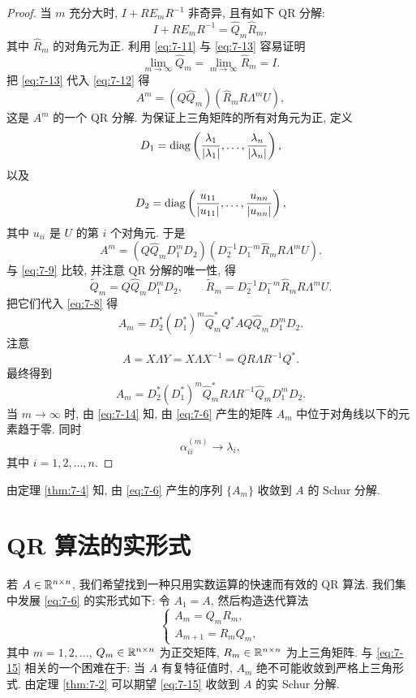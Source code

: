 \begin{proof}
当 $m$ 充分大时, $I+RE_mR^{-1}$ 非奇异, 且有如下 QR 分解:
\begin{equation}
  I+RE_mR^{-1}=\widehat{Q}_m\widehat{R}_m,
  \label{eq:7-13}
\end{equation}
其中 $\widehat{R}_m$ 的对角元为正. 利用 \eqref{eq:7-11} 与 \eqref{eq:7-13} 容易证明
\begin{equation}
  \lim_{m\rightarrow\infty}\widehat{Q}_m
  =\lim_{m\rightarrow\infty}\widehat{R}_m=I.
  \label{eq:7-14}
\end{equation}
把 \eqref{eq:7-13} 代入 \eqref{eq:7-12} 得
\[
  A^m=(Q\widehat{Q}_m)(\widehat{R}_mR\Lambda^mU),
\]
这是 $A^m$ 的一个 QR 分解. 为保证上三角矩阵的所有对角元为正, 定义
\[
  D_1=\operatorname{diag}\left(\frac{\lambda_1}{\left|\lambda_1\right|},\ldots,\frac{\lambda_n}{\left|\lambda_n\right|}\right),
\]
以及
\[
  D_2=\operatorname{diag}\left(\frac{u_{11}}{\left|u_{11}\right|},\ldots,\frac{u_{nn}}{\left|u_{nn}\right|}\right),
\]
其中 $u_{ii}$ 是 $U$ 的第 $i$ 个对角元. 于是
\[
  A^m=(Q\widehat{Q}_mD_1^mD_2)
  (D_2^{-1}D_1^{-m}\widehat{R}_mR\Lambda^mU).
\]
与 \eqref{eq:7-9} 比较, 并注意 QR 分解的唯一性, 得
\[
  \widetilde{Q}_m=Q\widehat{Q}_mD_1^mD_2,
  \qquad
  \widetilde{R}_m=D_2^{-1}D_1^{-m}\widehat{R}_mR\Lambda^mU.
\]
把它们代入 \eqref{eq:7-8} 得
\[
  A_m=D_2^*(D_1^*)^m\widehat{Q}_m^*Q^*AQ\widehat{Q}_mD_1^mD_2.
\]
注意
\[
  A=X\Lambda Y=X\Lambda X^{-1}=QR\Lambda R^{-1}Q^*.
\]
最终得到
\[
  A_m=D_2^*(D_1^*)^m\widehat{Q}_m^*R\Lambda R^{-1}\widehat{Q}_mD_1^mD_2.
\]
当 $m\rightarrow\infty$ 时, 由 \eqref{eq:7-14} 知, 由 \eqref{eq:7-6} 产生的矩阵 $A_m$ 中位于对角线以下的元素趋于零. 同时
\[
  \alpha_{ii}^{(m)}\rightarrow\lambda_i,
\]
其中 $i=1,2,\ldots,n$.
\end{proof}

由定理 \ref{thm:7-4} 知, 由 \eqref{eq:7-6} 产生的序列 $\{A_m\}$ 收敛到 $A$ 的 Schur 分解.

\section{QR 算法的实形式}
\label{sec:7-5}

若 $A\in\mathbb{R}^{n\times n}$, 我们希望找到一种只用实数运算的快速而有效的 QR 算法. 我们集中发展 \eqref{eq:7-6} 的实形式如下: 令 $A_1=A$, 然后构造迭代算法
\begin{equation}
  \left\{
  \begin{array}{l}
    A_m=Q_mR_m,\\
    A_{m+1}=R_mQ_m,
  \end{array}
  \right.
  \label{eq:7-15}
\end{equation}
其中 $m=1,2,\ldots$, $Q_m\in\mathbb{R}^{n\times n}$ 为正交矩阵, $R_m\in\mathbb{R}^{n\times n}$ 为上三角矩阵. 与 \eqref{eq:7-15} 相关的一个困难在于: 当 $A$ 有复特征值时, $A_m$ 绝不可能收敛到严格上三角形式. 由定理 \ref{thm:7-2} 可以期望 \eqref{eq:7-15} 收敛到 $A$ 的实 Schur 分解.

